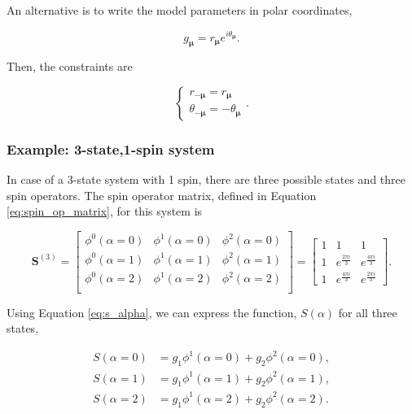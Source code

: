 \noindent
An alternative is to write the model parameters in polar coordinates,

\begin{equation}
    g_{\boldsymbol{\mu}} = r_{\boldsymbol{\mu}} e^{i \theta_{\boldsymbol{\mu}}}.
\end{equation}

\noindent
Then, the constraints are

\begin{equation}
    \begin{cases}
        r_{-\boldsymbol{\mu}} = r_{\boldsymbol{\mu}}\\
        \theta_{-\boldsymbol{\mu}} = -\theta_{\boldsymbol{\mu}}
    \end{cases}
    .
\end{equation}


\subsubsection{Example: 3-state,1-spin system}

In case of a 3-state system with 1 spin, there are three possible states and three spin operators.
The spin operator matrix, defined in Equation \ref{eq:spin_op_matrix}, for this system is 

\begin{equation}
    \mathbf{S}^{(3)} = \begin{bmatrix}
        \phi^0(\alpha=0) & \phi^1(\alpha=0) & \phi^2(\alpha=0)\\
        \phi^0(\alpha=1) & \phi^1(\alpha=1) & \phi^2(\alpha=1)\\
        \phi^0(\alpha=2) & \phi^1(\alpha=2) & \phi^2(\alpha=2)\\
    \end{bmatrix} = \begin{bmatrix}
        1 & 1 & 1\\
        1 & e^{\frac{2\pi i}{3}} & e^{\frac{4\pi i}{3}}\\
        1 & e^{\frac{4\pi i}{3}} & e^{\frac{2\pi i}{3}}
    \end{bmatrix}.
\end{equation}

\noindent
Using Equation \ref{eq:s_alpha}, we can express the function, $S(\alpha)$ for all three states,

\begin{align*}
    S(\alpha=0) &= g_1 \phi^1(\alpha=0) + g_2 \phi^2(\alpha=0),\\
    S(\alpha=1) &= g_1 \phi^1(\alpha=1) + g_2 \phi^2(\alpha=1),\\
    S(\alpha=2) &= g_1 \phi^1(\alpha=2) + g_2 \phi^2(\alpha=2).
\end{align*}

